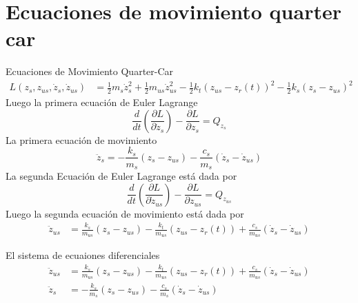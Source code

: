 \documentclass{beamer}
\begin{document}
\section{Ecuaciones de movimiento quarter car}
\begin{frame}{Ecuaciones de Movimiento Quarter-Car}
\begin{align*}
L(z_{s},z_{us},\dot z_{s},\dot z_{us}) & = \frac{1}{2} m_{s} \dot z_{s}^2 + \frac{1}{2} m_{us} \dot z_{us}^2 -\frac{1}{2} k_{t}(z_{us}-z_{r}(t))^2 -\frac{1}{2} k_{s}(z_{s}-z_{us})^2
\end{align*}
Luego la primera ecuación de Euler Lagrange
$$\frac{d}{dt}\left(\frac{\partial L} {\partial \dot z_{s}}\right) - \frac{\partial L}{\partial z_{s}} = Q_{z_{s}}$$
La primera ecuación de movimiento
$$\ddot z_{s} = -\frac {k_{s}}{m_{s}} (z_{s} - z_{us}) - \frac {c_{s}}{m_{s}} (\dot z_{s} - \dot z_{us})$$ 
La segunda Ecuación de Euler Lagrange está dada por
$$\frac{d}{dt}\left(\frac{\partial L} {\partial \dot z_{us}}\right) - \frac{\partial L}{\partial z_{us}} = Q_{z_{us}}$$
Luego la segunda ecuación de movimiento está dada por
\begin{align*}
\ddot z_{us} &= \frac {k_{s}}{m_{us}} (z_{s} - z_{us}) - \frac {k_{t}}{m_{us}}(z_{us}-z_{r}(t)) + \frac{c_{s}}{m_{us}} (\dot z_{s} - \dot z_{us})
\end{align*}

El sistema de ecuaiones diferenciales
\begin{align*}
\ddot z_{us} &= \frac {k_{s}}{m_{us}} (z_{s} - z_{us}) - \frac {k_{t}}{m_{us}}(z_{us}-z_{r}(t)) + \frac{c_{s}}{m_{us}} (\dot z_{s} - \dot z_{us})  \\
\ddot z_{s}  &= -\frac {k_{s}}{m_{s}} (z_{s} - z_{us}) - \frac {c_{s}}{m_{s}} (\dot z_{s} - \dot z_{us})
\end{align*}
\vskip 1cm
\end{frame}
\end{document}
